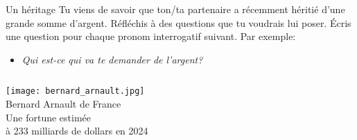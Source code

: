 \begin{frame}{Un héritage}
  Tu viens de savoir que ton/ta partenaire a récemment héritié d'une grande somme d'argent.
  Réfléchis à des questions que tu voudrais lui poser.
  Écris une question pour chaque pronom interrogatif suivant.
  Par exemple: \\
  \begin{itemize}
    \item \emph{Qui est-ce qui va te demander de l'argent?}
  \end{itemize}
  \begin{columns}
      \begin{center}
        \scriptsize
        \texttt{[image: bernard\_arnault.jpg]} \\
        Bernard Arnault de France \\
        Une fortune estimée \\
        à 233 milliards de dollars en 2024
      \end{center}
  \end{columns}
\end{frame}